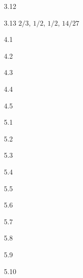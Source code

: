 \protect \hypertarget {soln:3.12}{}
\begin{solution}{{3.12}}
\end{solution}
\protect \hypertarget {soln:3.13}{}
\begin{solution}{{3.13}}
$ 2/3 $, $1/2$, $ 1/2 $, $ 14/27 $
\end{solution}
\protect \hypertarget {soln:4.1}{}
\begin{solution}{{4.1}}
\end{solution}
\protect \hypertarget {soln:4.2}{}
\begin{solution}{{4.2}}
\end{solution}
\protect \hypertarget {soln:4.3}{}
\begin{solution}{{4.3}}
\end{solution}
\protect \hypertarget {soln:4.4}{}
\begin{solution}{{4.4}}
\end{solution}
\protect \hypertarget {soln:4.5}{}
\begin{solution}{{4.5}}
\end{solution}
\protect \hypertarget {soln:5.1}{}
\begin{solution}{{5.1}}
\end{solution}
\protect \hypertarget {soln:5.2}{}
\begin{solution}{{5.2}}
\end{solution}
\protect \hypertarget {soln:5.3}{}
\begin{solution}{{5.3}}
\end{solution}
\protect \hypertarget {soln:5.4}{}
\begin{solution}{{5.4}}
\end{solution}
\protect \hypertarget {soln:5.5}{}
\begin{solution}{{5.5}}
\end{solution}
\protect \hypertarget {soln:5.6}{}
\begin{solution}{{5.6}}
\end{solution}
\protect \hypertarget {soln:5.7}{}
\begin{solution}{{5.7}}
\end{solution}
\protect \hypertarget {soln:5.8}{}
\begin{solution}{{5.8}}
\end{solution}
\protect \hypertarget {soln:5.9}{}
\begin{solution}{{5.9}}
\end{solution}
\protect \hypertarget {soln:5.10}{}
\begin{solution}{{5.10}}
\end{solution}
